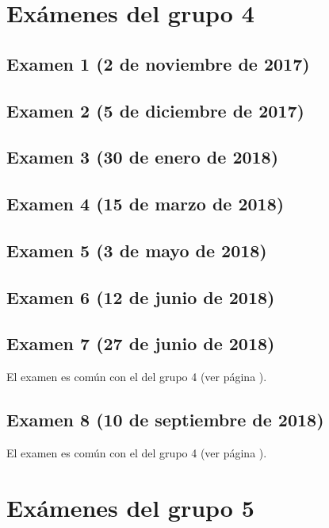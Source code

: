 \documentclass[a4paper,12pt,twoside]{book}
\begin{document}
\chapter{Exámenes del grupo 4}
\section{Examen 1 (2 de noviembre de 2017)}
\section{Examen 2 (5 de diciembre de 2017)}
\section{Examen 3 (30 de enero de 2018)}
 \label{examen_17_18_4_3}
\section{Examen 4 (15 de marzo de 2018)}
\section{Examen 5 (3 de mayo de 2018)}
\section{Examen 6 (12 de junio de 2018)} \label{examen_17_18_4_6}
\section{Examen 7 (27 de junio de 2018)}
El examen es común con el del grupo 4 (ver página \pageref{examen_17_18_1_7}).
\section{Examen 8 (10 de septiembre de 2018)}
El examen es común con el del grupo 4 (ver página \pageref{examen_17_18_1_8}).

\chapter{Exámenes del grupo 5}
\end{document}
